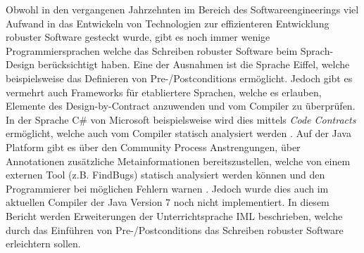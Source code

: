 Obwohl in den vergangenen Jahrzehnten im Bereich des Softwareengineerings viel 
Aufwand in das Entwickeln von Technologien zur effizienteren Entwicklung robuster
Software gesteckt wurde, gibt es noch immer wenige Programmiersprachen welche 
das Schreiben robuster Software beim Sprach-Design berücksichtigt haben. Eine der Ausnahmen 
ist die Sprache Eiffel, welche beispielsweise das Definieren von Pre-/Postconditions
ermöglicht. Jedoch gibt es vermehrt auch Frameworks für etabliertere Sprachen, welche 
es erlauben, Elemente des Design-by-Contract anzuwenden und vom Compiler zu überprüfen.
In der Sprache C\# von Microsoft beispielsweise wird dies mittels \textit{Code Contracts}
 ermöglicht, welche auch vom Compiler statisch analysiert werden \cite{MS:CodeContracts}.
Auf der Java Platform gibt es über den Community Process Anstrengungen, über Annotationen
zusätzliche Metainformationen bereitszustellen, welche von einem externen Tool (z.B. FindBugs) statisch analysiert 
werden können und den Programmierer bei möglichen Fehlern warnen \cite{JSR:305}. Jedoch wurde dies
auch im aktuellen Compiler der Java Version 7 noch nicht implementiert. In diesem Bericht werden Erweiterungen
der Unterrichtsprache IML beschrieben, welche durch das Einführen von Pre-/Postconditions das Schreiben robuster Software erleichtern sollen.


